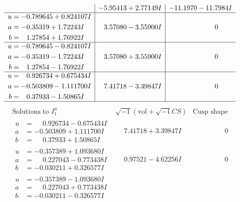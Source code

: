 \documentclass[1p]{elsarticle_modified}
\theoremstyle{definition}
\newcommand{\I}{\sqrt{-1}}
\begin{document}
$$\begin{array}{c|c|c}
 & -5.95413 + 2.77149 I & -11.1970 - 11.7984 I \\ \hline\begin{aligned}
u &= -0.789645 + 0.824107 I \\
a &= -0.35319 + 1.72243 I \\
b &= \phantom{-}1.27854 + 1.76922 I\end{aligned}
 & \phantom{-}3.57080 - 3.55900 I & \phantom{-0.000000 } 0 \\ \hline\begin{aligned}
u &= -0.789645 - 0.824107 I \\
a &= -0.35319 - 1.72243 I \\
b &= \phantom{-}1.27854 - 1.76922 I\end{aligned}
 & \phantom{-}3.57080 + 3.55900 I & \phantom{-0.000000 } 0 \\ \hline\begin{aligned}
u &= \phantom{-}0.926734 + 0.675434 I \\
a &= -0.503809 - 1.111700 I \\
b &= \phantom{-}0.37933 - 1.50865 I\end{aligned}
 & \phantom{-}7.41718 - 3.39847 I & \phantom{-0.000000 } 0\\
 \hline 
 \end{array}$$\newpage$$\begin{array}{c|c|c}  
\text{Solutions to }I^u_{1}& \I (\text{vol} + \sqrt{-1}CS) & \text{Cusp shape}\\
 \hline 
\begin{aligned}
u &= \phantom{-}0.926734 - 0.675434 I \\
a &= -0.503809 + 1.111700 I \\
b &= \phantom{-}0.37933 + 1.50865 I\end{aligned}
 & \phantom{-}7.41718 + 3.39847 I & \phantom{-0.000000 } 0 \\ \hline\begin{aligned}
u &= -0.357389 + 1.093680 I \\
a &= \phantom{-}0.227043 - 0.773438 I \\
b &= -0.030211 + 0.326577 I\end{aligned}
 & \phantom{-}0.97521 - 4.62256 I & \phantom{-0.000000 } 0 \\ \hline\begin{aligned}
u &= -0.357389 - 1.093680 I \\
a &= \phantom{-}0.227043 + 0.773438 I \\
b &= -0.030211 - 0.326577 I\end{aligned}

\end{array}$$
\end{document}

